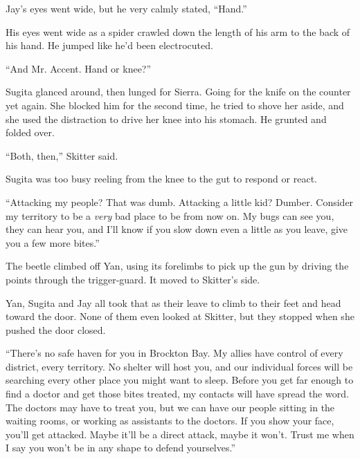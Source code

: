 Jay's eyes went wide, but he very calmly stated, ``Hand.''



His eyes went wide as a spider crawled down the length of his arm to the back of his hand.  He jumped like he'd been electrocuted.



``And Mr. Accent.  Hand or knee?''



Sugita glanced around, then lunged for Sierra.  Going for the knife on the counter yet again.  She blocked him for the second time, he tried to shove her aside, and she used the distraction to drive her knee into his stomach.  He grunted and folded over.



``Both, then,'' Skitter said.



Sugita was too busy reeling from the knee to the gut to respond or react.



``Attacking my people?  That was dumb.  Attacking a little kid?  Dumber.  Consider my territory to be a \emph{very} bad place to be from now on.  My bugs can see you, they can hear you, and I'll know if you slow down even a little as you leave, give you a few more bites.''



The beetle climbed off Yan, using its forelimbs to pick up the gun by driving the points through the trigger-guard.  It moved to Skitter's side.



Yan, Sugita and Jay all took that as their leave to climb to their feet and head toward the door.  None of them even looked at Skitter, but they stopped when she pushed the door closed.



``There's no safe haven for you in Brockton Bay.  My allies have control of every district, every territory.  No shelter will host you, and our individual forces will be searching every other place you might want to sleep.  Before you get far enough to find a doctor and get those bites treated, my contacts will have spread the word.  The doctors may have to treat you, but we can have our people sitting in the waiting rooms, or working as assistants to the doctors.  If you show your face, you'll get attacked.  Maybe it'll be a direct attack, maybe it won't.  Trust me when I say you won't be in any shape to defend yourselves.''




